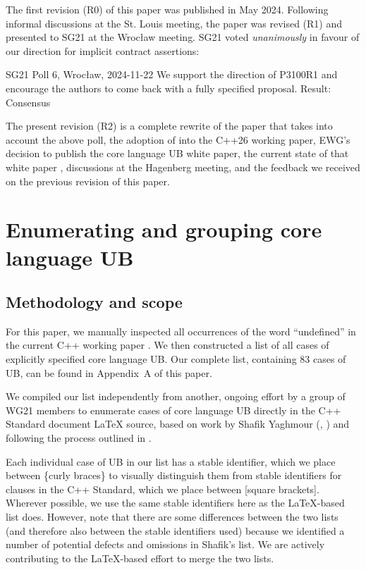 The first revision (R0) of this paper was published in May 2024. Following informal discussions at the St. Louis meeting, the paper was revised (R1) and presented to SG21 at the Wroc{\l}aw meeting. SG21 voted \emph{unanimously} in favour of our direction for implicit contract assertions:
\vspace{2mm}
\begin{wgpoll}{{SG21 Poll 6, Wroc{\l}aw, 2024-11-22}}
We support the direction of P3100R1 and encourage the authors to come back with a fully specified proposal.
Result: Consensus
\end{wgpoll}
\vspace{2mm}

The present revision (R2) is a complete rewrite of the paper that takes into account the above poll, the adoption of \cite{P2900R14} into the C++26 working paper, EWG's decision to publish the core language UB white paper, the current state of that white paper \cite{P3656R1}, discussions at the Hagenberg meeting, and the feedback we received on the previous revision of this paper.

\section{Enumerating and grouping core language UB}
\label{ub}

\subsection{Methodology and scope}

For this paper, we manually inspected all occurrences of the word ``undefined'' in the current C++ working paper \cite{N5008}. We then constructed a list of all cases of explicitly specified core language UB. Our complete list, containing 83 cases of UB, can be found in Appendix~A of this paper. %

We compiled our list independently from another, ongoing effort by a group of WG21 members to enumerate cases of core language UB directly in the C++ Standard document  \LaTeX{} source, based on work by Shafik Yaghmour (\cite{P1705R1}, \cite{P3075R0}) and following the process outlined in \cite{P3656R1}.

Each individual case of UB in our list has a stable identifier, which we place between \{curly braces\} to visually distinguish them from stable identifiers for clauses in the C++ Standard, which we place between [square brackets]. Wherever possible, we use the same stable identifiers here as the \LaTeX-based list does. However, note that there are some differences between the two lists (and therefore also between the stable identifiers used) because we identified a number of potential defects and omissions in Shafik's list. We are actively contributing to the \LaTeX-based effort to merge the two lists. 

